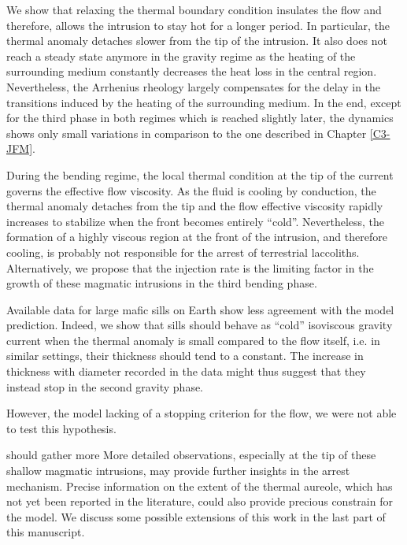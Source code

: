 We show  that relaxing  the thermal  boundary condition  insulates the
flow and  therefore, allows  the intrusion  to stay  hot for  a longer
period.  In particular,  the thermal anomaly detaches  slower from the
tip of the  intrusion.  It also does not reach  a steady state anymore
in  the  gravity regime  as  the  heating  of the  surrounding  medium
constantly    decreases    the    heat    loss    in    the    central
region. Nevertheless,  the Arrhenius rheology largely  compensates for
the delay in the transitions induced by the heating of the surrounding
medium.  In the end, except for  the third phase in both regimes which
is reached slightly later, the dynamics shows only small variations in
comparison to the one described in Chapter \ref{C3-JFM}.

During the bending  regime, the local thermal condition at  the tip of
the current  governs the  effective flow viscosity.   As the  fluid is
cooling by conduction,  the thermal anomaly detaches from  the tip and
the flow effective  viscosity rapidly increases to  stabilize when the
front  becomes entirely  ``cold''.  Nevertheless,  the formation  of a
highly viscous  region at  the front of  the intrusion,  and therefore
cooling, is  probably not  responsible for  the arrest  of terrestrial
laccoliths.  Alternatively, we propose that  the injection rate is the
limiting  factor in  the growth  of these  magmatic intrusions  in the
third bending phase.

Available data for large mafic sills on Earth show less agreement with
the model  prediction.  Indeed,  we show that  sills should  behave as
``cold'' isoviscous gravity current when  the thermal anomaly is small
compared  to  the  flow  itself,  i.e.   in  similar  settings,  their
thickness should tend  to a constant.  The increase  in thickness with
diameter recorded  in the  data might thus  suggest that  they instead
stop in the second gravity phase.


However, the  model lacking of a  stopping criterion for the  flow, we
were not able to test this hypothesis.

should gather more  More detailed observations, especially  at the tip
of these shallow magmatic intrusions,  may provide further insights in
the  arrest  mechanism.  Precise  information  on  the extent  of  the
thermal aureole,  which has not  yet been reported in  the literature,
could also provide precious constrain  for the model.  We discuss some
possible extensions of this work in the last part of this manuscript.


